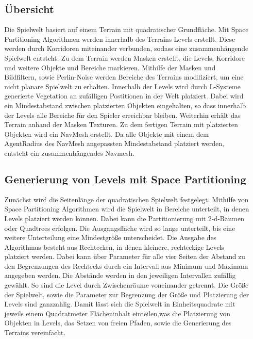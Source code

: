 \subsection{Übersicht}
Die Spielwelt basiert auf einem Terrain mit quadratischer Grundfläche. Mit Space Partitioning Algorithmen werden innerhalb des Terrains Levels erstellt. Diese werden durch Korridoren miteinander verbunden, sodass eine zusammenhängende Spielwelt entsteht. Zu dem Terrain werden Masken erstellt, die Levels, Korridore und weitere Objekte und Bereiche markieren. Mithilfe der Masken und Bildfiltern, sowie Perlin-Noise werden Bereiche des Terrains modifiziert, um eine nicht planare Spielwelt zu erhalten. Innerhalb der Levels wird durch L-Systeme generierte Vegetation an zufälligen Postitionen in der Welt platziert. Dabei wird ein Mindestabstand zwischen platzierten Objekten eingehalten, so dass innerhalb der Levels alle Bereiche für den Spieler erreichbar bleiben. Weiterhin erhält das Terrain anhand der Masken Texturen. Zu dem fertigen Terrain mit platzierten Objekten wird ein NavMesh erstellt. Da alle Objekte mit einem dem AgentRadius des NavMesh angepassten Mindestabstand platziert werden, entsteht ein zusammenhängendes Navmesh. 


\subsection{Generierung von Levels mit Space Partitioning}
Zunächst wird die Seitenlänge der quadratischen Spielwelt festgelegt. Mithilfe von Space Partitioning Algorithmen wird die Spielwelt in Bereiche unterteilt, in denen Levels platziert werden können. Dabei kann die Partitionierung mit $2$-d-Bäumen oder Quadtrees erfolgen. Die Ausgangsfläche wird so lange unterteilt, bis eine weitere Unterteilung eine Mindestgröße unterscheidet. Die Ausgabe des Algorithmus besteht aus Rechtecken, in denen kleinere, rechteckige Levels platziert werden. Dabei kann über Parameter für alle vier Seiten der Abstand zu den Begrenzungen des Rechtecks durch ein Intervall aus Minimum und Maximum angegeben werden. Die Abstände werden in den jeweiligen Intervallen zufällig gewählt. So sind die Level durch Zwischenräume voneinander getrennt. Die Größe der Spielwelt, sowie die Parameter zur Begrenzung der Größe und Platzierung der Levels sind ganzzahlig. Damit lässt sich die Spielwelt in Einheitsquadrate mit jeweils einem Quadratmeter Flächeninhalt einteilen,was die Platzierung von Objekten in Levels, das Setzen von freien Pfaden, sowie die Generierung des Terrains vereinfacht.


